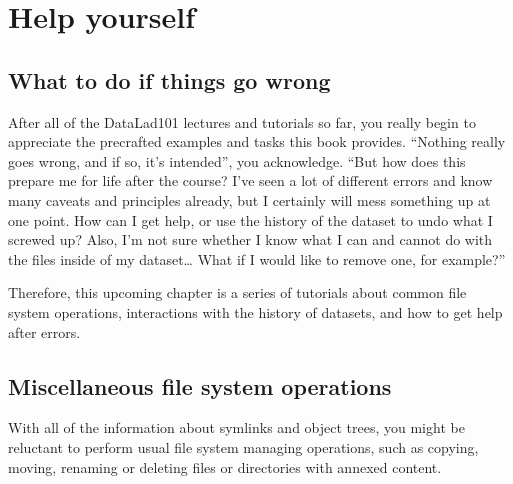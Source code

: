 \chapter{Help yourself}
\label{\detokenize{basics/basics-help:help-yourself}}\label{\detokenize{basics/basics-help:chapter-help}}\label{\detokenize{basics/basics-help::doc}}

\sphinxstepscope


\section{What to do if things go wrong}
\label{\detokenize{basics/101-135-intro:what-to-do-if-things-go-wrong}}\label{\detokenize{basics/101-135-intro:intro}}\label{\detokenize{basics/101-135-intro::doc}}
\sphinxAtStartPar
After all of the DataLad\sphinxhyphen{}101 lectures and tutorials so far, you really begin to
appreciate the pre\sphinxhyphen{}crafted examples and tasks this book provides.
“Nothing really goes wrong, and if so, it’s intended”, you acknowledge.
“But how does this prepare me for life after the course? I’ve seen a lot of
different errors and know many caveats and principles already, but I certainly
will mess something up at one point. How can I get help, or use the history of
the dataset to undo what I screwed up? Also, I’m not sure whether I know what I
can and cannot do with the files inside of my dataset… What if I would
like to remove one, for example?”

\sphinxAtStartPar
Therefore, this upcoming chapter is a series of tutorials about common
file system operations, interactions with the history of datasets, and how
to get help after errors.

\sphinxstepscope


\section{Miscellaneous file system operations}
\label{\detokenize{basics/101-136-filesystem:miscellaneous-file-system-operations}}\label{\detokenize{basics/101-136-filesystem:file-system}}\label{\detokenize{basics/101-136-filesystem::doc}}
\sphinxAtStartPar
With all of the information about symlinks and object trees,
you might be reluctant to perform usual file system managing
operations, such as copying, moving, renaming or deleting
files or directories with annexed content.

